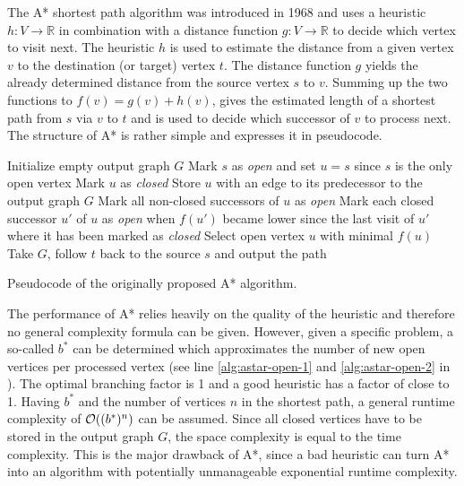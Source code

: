 			The A* shortest path algorithm was introduced in 1968 and uses a heuristic $h : V \rightarrow \mathbb{R}$ in combination with a distance function $g : V \rightarrow \mathbb{R}$ to decide which vertex to visit next\cite{astar}.
			The heuristic $h$ is used to estimate the distance from a given vertex $v$ to the destination (or target) vertex $t$.
			The distance function $g$ yields the already determined distance from the source vertex $s$ to $v$.
			Summing up the two functions to $f(v) = g(v) + h(v)$, gives the estimated length of a shortest path from $s$ via $v$ to $t$ and is used to decide which successor of $v$ to process next.
			The structure of A* is rather simple and  expresses it in pseudocode.
			
			\begin{algorithm}[h]
				\begin{algorithmic}[1]
					\State Initialize empty output graph $G$
					\State Mark $s$ as \emph{open} and set $u = s$ since $s$ is the only open vertex
						\State Mark $u$ as \emph{closed}
						\State Store $u$ with an edge to its predecessor to the output graph $G$
						\State Mark all non-closed successors of $u$ as \emph{open} \label{alg:astar-open-1}
						\State Mark each closed successor $u'$ of $u$ as \emph{open} when $f(u')$ became lower since the last visit of $u'$ where it has been marked as \emph{closed} \label{alg:astar-open-2}
						\State Select open vertex $u$ with minimal $f(u)$
					\EndWhile
					\State Take $G$, follow $t$ back to the source $s$ and output the path
				\end{algorithmic}
				\caption{Pseudocode of the originally proposed A* algorithm\cite{astar}.}
				\label{alg:astar}
			\end{algorithm}
			
			The performance of A* relies heavily on the quality of the heuristic and therefore no general complexity formula can be given\cite{russell-norvig-ai-modern-approach}.
			However, given a specific problem, a so-called  $b^*$ can be determined which approximates the number of new open vertices per processed vertex (see line \ref{alg:astar-open-1} and \ref{alg:astar-open-2} in ).
			The optimal branching factor is 1 and a good heuristic has a factor of close to 1.
			Having $b^*$ and the number of vertices $n$ in the shortest path, a general runtime complexity of $\mathcal{O}((b^*)^n)$ can be assumed.
			Since all closed vertices have to be stored in the output graph $G$, the space complexity is equal to the time complexity.
			This is the major drawback of A*, since a bad heuristic can turn A* into an algorithm with potentially unmanageable exponential runtime complexity.
		
